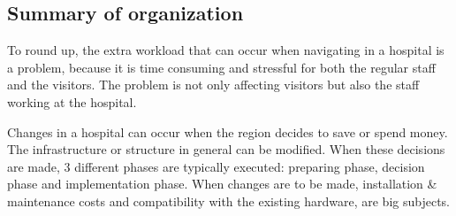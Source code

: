 \subsection{Summary of organization}

To round up, the extra workload that can occur when navigating in a hospital is a problem, because it is time consuming and stressful for both the regular staff and the visitors. The problem is not only affecting visitors but also the staff working at the hospital. 

Changes in a hospital can occur when the region decides to save or spend money. The infrastructure or structure in general can be modified. When these decisions are made, 3 different phases are typically executed: preparing phase, decision phase and implementation phase. When changes are to be made, installation \& maintenance costs and compatibility with the existing hardware, are big subjects.



